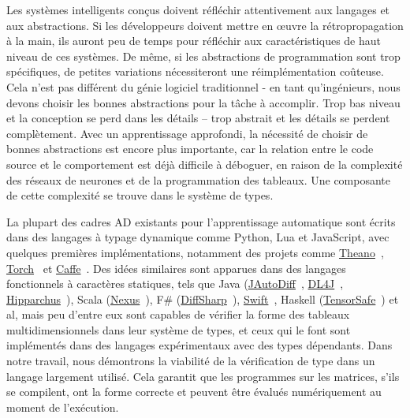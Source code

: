 Les systèmes intelligents conçus doivent réfléchir attentivement aux langages et aux abstractions. Si les développeurs doivent mettre en œuvre la rétropropagation à la main, ils auront peu de temps pour réfléchir aux caractéristiques de haut niveau de ces systèmes. De même, si les abstractions de programmation sont trop spécifiques, de petites variations nécessiteront une réimplémentation coûteuse. Cela n'est pas différent du génie logiciel traditionnel - en tant qu'ingénieurs, nous devons choisir les bonnes abstractions pour la tâche à accomplir. Trop bas niveau et la conception se perd dans les détails -- trop abstrait et les détails se perdent complètement. Avec un apprentissage approfondi, la nécessité de choisir de bonnes abstractions est encore plus importante, car la relation entre le code source et le comportement est déjà difficile à déboguer, en raison de la complexité des réseaux de neurones et de la programmation des tableaux. Une composante de cette complexité se trouve dans le système de types.

La plupart des cadres AD existants pour l'apprentissage automatique sont écrits dans des langages à typage dynamique comme Python, Lua et JavaScript, avec quelques premières implémentations, notamment des projets comme \href{http://deeplearning.net/software/theano/}{Theano}~\citep{bergstra2010theano}, \href{http://torch.ch/}{Torch}~\citep{collobert2002torch} et \href{https://caffe.berkeleyvision.org/}{Caffe}~\citep{jia2014caffe}. Des idées similaires sont apparues dans des langages fonctionnels à caractères statiques, tels que Java (\href{https://github.com/uniker9/JAutoDiff}{JAutoDiff}~\citep{nureki2012jautodiff}, \href{https://deeplearning4j.org/}{DL4J}~\citep{team2016dl4j}, \href{https://github.com/Hipparchus-Math/hipparchus}{Hipparchus}~\citep{andrea2016automatic}), Scala (\href{https://tongfei. me/nexus/}{Nexus}~\citep{chen2017typesafe}), F\# (\href{http://diffsharp.github.io/DiffSharp/}{DiffSharp}~\citep{baydin2015diffsharp}), \href{https://www. tensorflow.org/swift}{Swift}~\citep{lattner2018tensorflow}, Haskell (\href{https://github.com/leopiney/tensor-safe}{TensorSafe}~\citep{pineyro2019structure}) et al, mais peu d'entre eux sont capables de vérifier la forme des tableaux multidimensionnels dans leur système de types, et ceux qui le font sont implémentés dans des langages expérimentaux avec des types dépendants. Dans notre travail, nous démontrons la viabilité de la vérification de type dans un langage largement utilisé. Cela garantit que les programmes sur les matrices, s'ils se compilent, ont la forme correcte et peuvent être évalués numériquement au moment de l'exécution.

